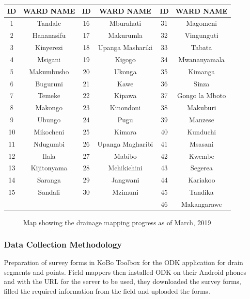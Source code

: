 \documentclass[a4paper,12pt,twoside]{article}
\begin{document}
\begin{center}
\begin{tabular}{|c|c|c|c|c|c|}
\hline
ID & WARD NAME & ID & WARD NAME & ID & WARD NAME\\
\hline
1 & Tandale & 16 & Mburahati & 31 & Magomeni\\
2 & Hananasifu & 17 & Makurumla & 32 & Vingunguti\\
3 & Kinyerezi & 18 & Upanga Mashariki & 33 & Tabata\\
4 & Msigani & 19 & Kigogo & 34 & Mwananyamala\\
5 & Makumbusho & 20 & Ukonga & 35 & Kimanga\\
6 & Buguruni & 21 & Kawe & 36 & Sinza\\
7 & Temeke & 22 & Kipawa & 37 & Gongo la Mboto\\
8 & Makongo & 23 & Kinondoni & 38 & Makuburi\\
9 & Ubungo & 24 & Pugu & 39 & Manzese\\
10 & Mikocheni & 25 & Kimara & 40 & Kunduchi\\
11 & Ndugumbi & 26 & Upanga Magharibi & 41 & Msasani\\
12 & Ilala & 27 & Mabibo & 42 & Kwembe\\
13 & Kijitonyama & 28 & Mchikichini & 43 & Segerea\\
14 & Saranga & 29 & Jangwani & 44 & Kariakoo\\
15 & Sandali & 30 & Mzimuni & 45 & Tandika\\
{} & {} & {} & {} & 46 & Makangarawe\\
 \hline
\end{tabular}
\end{center}

\begin{figure}[h]
  \color{RHgreen}\caption{Map showing the drainage mapping progress as of March, 2019}
  \centering
\end{figure}

\subsubsection{Data Collection Methodology}
Preparation of survey forms in KoBo Toolbox for the ODK application for drain segments and points. Field mappers then installed ODK on their Android phones and with the URL for the server to be used, they downloaded the survey forms, filled the required information from the field and uploaded the forms.
\end{document}
